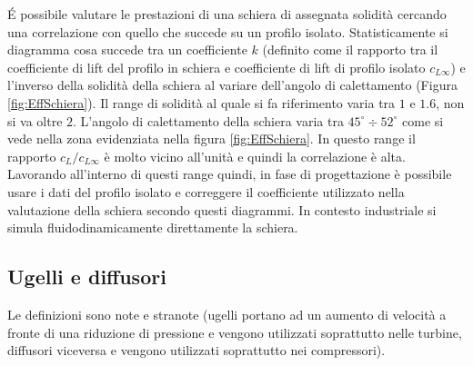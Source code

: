\'E possibile valutare le prestazioni di una schiera di assegnata solidità cercando una correlazione con quello che succede su un profilo isolato. Statisticamente si diagramma cosa succede tra un coefficiente $k$ (definito come il rapporto tra il coefficiente di lift del profilo in schiera e coefficiente di lift di profilo isolato $c_{L \infty}$) e l'inverso della solidità della schiera al variare dell'angolo di calettamento (Figura \ref{fig:EffSchiera}). Il range di solidità al quale si fa riferimento varia tra $1$ e $1.6$, non si va oltre $2$. L'angolo di calettamento della schiera varia tra $45^{\circ} \div 52^{\circ}$ come si vede nella zona evidenziata nella figura \ref{fig:EffSchiera}. In questo range il rapporto $c_L / c_{L \infty}$ è molto vicino all'unità e quindi la correlazione è alta.\\
Lavorando all'interno di questi range quindi, in fase di progettazione è possibile usare i dati del profilo isolato e correggere il coefficiente utilizzato nella valutazione della schiera secondo questi diagrammi. In contesto industriale si simula fluidodinamicamente direttamente la schiera.
\subsection{Ugelli e diffusori}
Le definizioni sono note e stranote (ugelli portano ad un aumento di velocità a fronte di una riduzione di pressione e vengono utilizzati soprattutto nelle turbine, diffusori viceversa e vengono utilizzati soprattutto nei compressori). 

